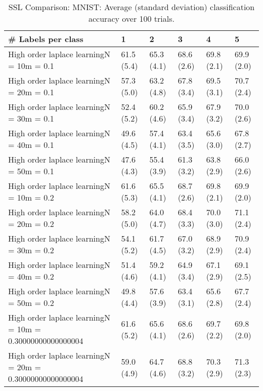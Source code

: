 \documentclass{article}
\begin{document}
\begin{table*}[t!]
\vspace{-3mm}
\caption{SSL Comparison: MNIST: Average (standard deviation) classification accuracy over 100 trials.}
\vspace{-3mm}
\label{tab:SSL Comparison: MNIST}
\vskip 0.15in
\begin{center}
\begin{small}
\begin{sc}
\begin{tabular}{llllll}
\toprule
\# Labels per class&\textbf{1}&\textbf{2}&\textbf{3}&\textbf{4}&\textbf{5}\\
\midrule
High order laplace learningN = 10m = 0.1&61.5 (5.4)      &65.3 (4.1)      &68.6 (2.6)      &69.8 (2.1)      &69.9 (2.0)      \\
High order laplace learningN = 20m = 0.1&57.3 (5.0)      &63.2 (4.8)      &67.8 (3.4)      &69.5 (3.1)      &70.7 (2.4)      \\
High order laplace learningN = 30m = 0.1&52.4 (5.2)      &60.2 (4.6)      &65.9 (3.4)      &67.9 (3.2)      &70.0 (2.6)      \\
High order laplace learningN = 40m = 0.1&49.6 (4.5)      &57.4 (4.1)      &63.4 (3.5)      &65.6 (3.0)      &67.8 (2.7)      \\
High order laplace learningN = 50m = 0.1&47.6 (4.3)      &55.4 (3.9)      &61.3 (3.2)      &63.8 (2.9)      &66.0 (2.6)      \\
High order laplace learningN = 10m = 0.2&61.6 (5.3)      &65.5 (4.1)      &68.7 (2.6)      &69.8 (2.1)      &69.9 (2.0)      \\
High order laplace learningN = 20m = 0.2&58.2 (5.0)      &64.0 (4.7)      &68.4 (3.3)      &70.0 (3.0)      &71.1 (2.4)      \\
High order laplace learningN = 30m = 0.2&54.1 (5.2)      &61.7 (4.5)      &67.0 (3.2)      &68.9 (2.9)      &70.9 (2.4)      \\
High order laplace learningN = 40m = 0.2&51.4 (4.6)      &59.2 (4.1)      &64.9 (3.4)      &67.1 (2.9)      &69.1 (2.5)      \\
High order laplace learningN = 50m = 0.2&49.8 (4.4)      &57.6 (3.9)      &63.4 (3.1)      &65.6 (2.8)      &67.7 (2.4)      \\
High order laplace learningN = 10m = 0.30000000000000004&61.6 (5.2)      &65.6 (4.1)      &68.6 (2.6)      &69.7 (2.2)      &69.8 (2.0)      \\
High order laplace learningN = 20m = 0.30000000000000004&59.0 (4.9)      &64.7 (4.6)      &68.8 (3.2)      &70.3 (2.9)      &71.3 (2.3)      \\

\end{tabular}
\end{sc}
\end{small}
\end{center}
\end{table*}
\end{document}
